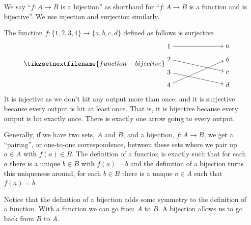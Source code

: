 \documentclass[fleqn]{LectureClass/LectureClass}
\begin{document}
    \begin{ntn}{}{}
        We say \enquote{\(f \colon A \to B\) is a bijection} as shorthand for \enquote{\(f \colon A \to B\) is a function and is bijective}.
        We use injection and surjection similarly.
    \end{ntn}
    
    \begin{exm}{}{}
        The function \(f \colon \{1, 2, 3, 4\} \to \{a, b, c, d\}\) defined as follows is surjective
        \begin{equation}
            \tikzsetnextfilename{function-bijective}
            \begin{tikzpicture}[baseline=(current bounding box)]
                \node (a) at (3, 2) {\(a\)};
                \node (b) at (3, 1.33) {\(b\)};
                \node (c) at (3, 0.66) {\(c\)};
                \node (d) at (3, 0) {\(d\)};
                \node (n1) at (0, 2) {\(1\)};
                \node (n2) at (0, 1.33) {\(2\)};
                \node (n3) at (0, 0.66) {\(3\)};
                \node (n4) at (0, 0) {\(4\)};
                \draw [->] (n1) -- (a);
                \draw [->] (n2) -- (c);
                \draw [->] (n3) -- (d);
                \draw [->] (n4) -- (b);
            \end{tikzpicture}
        \end{equation}
        It is injective as we don't hit any output more than once, and it is surjective because every output is hit at least once.
        That is, it is bijective because every output is hit exactly once.
        There is exactly one arrow going to every output.
        
        Generally, if we have two sets, \(A\) and \(B\), and a bijection, \(f \colon A \to B\), we get a \enquote{pairing}, or one-to-one correspondence, between these sets where we pair up \(a \in A\) with \(f(a) \in B\).
        The definition of a function is exactly such that for each \(a\) there is a unique \(b \in B\) with \(f(a) = b\) and the definition of a bijection turns this uniqueness around, for each \(b \in B\) there is a unique \(a \in A\) such that \(f(a) = b\). 
    \end{exm}
    
    Notice that the definition of a bijection adds some symmetry to the definition of a function.
    With a function we can go from \(A\) to \(B\).
    A bijection allows us to go back from \(B\) to \(A\).
    
\end{document}
